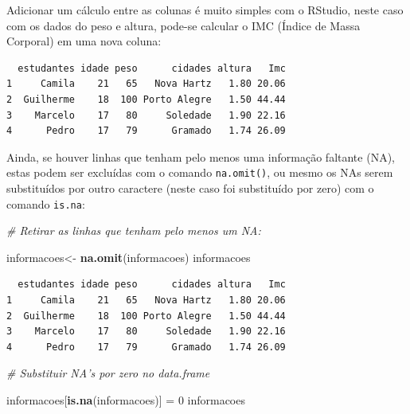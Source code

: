 \documentclass[12pt,portuguese,oneside]{book}
\newenvironment{Shaded}{\begin{snugshade}}{\end{snugshade}}
\newcommand{\KeywordTok}[1]{\textcolor[rgb]{0.13,0.29,0.53}{\textbf{#1}}}
\newcommand{\DecValTok}[1]{\textcolor[rgb]{0.00,0.00,0.81}{#1}}
\newcommand{\StringTok}[1]{\textcolor[rgb]{0.31,0.60,0.02}{#1}}
\newcommand{\CommentTok}[1]{\textcolor[rgb]{0.56,0.35,0.01}{\textit{#1}}}
\newcommand{\OperatorTok}[1]{\textcolor[rgb]{0.81,0.36,0.00}{\textbf{#1}}}
\newcommand{\NormalTok}[1]{#1}
\begin{document}
Adicionar um cálculo entre as colunas é muito simples com o RStudio,
neste caso com os dados do peso e altura, pode-se calcular o IMC (Índice
de Massa Corporal) em uma nova coluna:

\begin{Shaded}
\end{Shaded}

\begin{verbatim}
  estudantes idade peso      cidades altura   Imc
1     Camila    21   65   Nova Hartz   1.80 20.06
2  Guilherme    18  100 Porto Alegre   1.50 44.44
3    Marcelo    17   80     Soledade   1.90 22.16
4      Pedro    17   79      Gramado   1.74 26.09
\end{verbatim}

Ainda, se houver linhas que tenham pelo menos uma informação faltante
(NA), estas podem ser excluídas com o comando \texttt{na.omit()}, ou
mesmo os NAs serem substituídos por outro caractere (neste caso foi
substituído por zero) com o comando \texttt{is.na}:

\begin{Shaded}
\begin{Highlighting}[]
\CommentTok{# Retirar as linhas que tenham pelo menos um NA:}

\NormalTok{informacoes<-}\StringTok{ }\KeywordTok{na.omit}\NormalTok{(informacoes)}
\NormalTok{informacoes}
\end{Highlighting}
\end{Shaded}

\begin{verbatim}
  estudantes idade peso      cidades altura   Imc
1     Camila    21   65   Nova Hartz   1.80 20.06
2  Guilherme    18  100 Porto Alegre   1.50 44.44
3    Marcelo    17   80     Soledade   1.90 22.16
4      Pedro    17   79      Gramado   1.74 26.09
\end{verbatim}

\begin{Shaded}
\begin{Highlighting}[]
\CommentTok{# Substituir NA's por zero no data.frame}

\NormalTok{informacoes[}\KeywordTok{is.na}\NormalTok{(informacoes)] =}\StringTok{ }\DecValTok{0}
\NormalTok{informacoes}
\end{Highlighting}
\end{Shaded}
\end{document}
